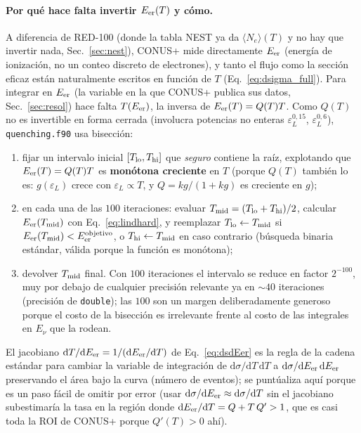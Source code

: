 \documentclass[11pt,a4paper]{article}
\newcommand{\eps}{\varepsilon}
\newcommand{\Enu}{E_{\nu}}
\newcommand{\Tnr}{T}
\newcommand{\Ne}{N_{e}}
\newcommand{\Eer}{E_{\rm er}}
\newcommand{\code}[1]{\texttt{#1}}
\newcommand{\dd}{\mathrm{d}}
\begin{document}
\paragraph{Por qu\'e hace falta invertir $\Eer(\Tnr)$ y c\'omo.} A diferencia de
RED-100 (donde la tabla NEST ya da $\langle\Ne\rangle(\Tnr)$ y no hay que
invertir nada, Sec.~\ref{sec:nest}), CONUS+ mide directamente $\Eer$ (energ\'ia
de ionizaci\'on, no un conteo discreto de electrones), y tanto el flujo como la
secci\'on eficaz est\'an naturalmente escritos en funci\'on de $\Tnr$
(Eq.~\eqref{eq:dsigma_full}). Para integrar en $\Eer$ (la variable en la que
CONUS+ publica sus datos, Sec.~\ref{sec:resol}) hace falta $\Tnr(\Eer)$, la
inversa de $\Eer(\Tnr)=Q(\Tnr)\Tnr$. Como $Q(\Tnr)$ no es invertible en forma
cerrada (involucra potencias no enteras $\eps_{L}^{0{,}15}$, $\eps_{L}^{0{,}6}$),
\code{quenching.f90} usa bisecci\'on:
\begin{enumerate}\itemsep2pt
  \item fijar un intervalo inicial $[\Tnr_{\rm lo},\Tnr_{\rm hi}]$ que
    \emph{seguro} contiene la ra\'iz, explotando que $\Eer(\Tnr)=Q(\Tnr)\Tnr$ es
    \textbf{mon\'otona creciente} en $\Tnr$ (porque $Q(\Tnr)$ tambi\'en lo es:
    $g(\eps_L)$ crece con $\eps_L\propto\Tnr$, y $Q=kg/(1+kg)$ es creciente en
    $g$);
  \item en cada una de las $100$ iteraciones: evaluar $\Tnr_{\rm mid}=
    (\Tnr_{\rm lo}+\Tnr_{\rm hi})/2$, calcular $\Eer(\Tnr_{\rm mid})$ con
    Eq.~\eqref{eq:lindhard}, y reemplazar $\Tnr_{\rm lo}\leftarrow\Tnr_{\rm mid}$
    si $\Eer(\Tnr_{\rm mid})<\Eer^{\rm objetivo}$, o $\Tnr_{\rm
    hi}\leftarrow\Tnr_{\rm mid}$ en caso contrario (b\'usqueda binaria est\'andar,
    v\'alida porque la funci\'on es mon\'otona);
  \item devolver $\Tnr_{\rm mid}$ final. Con $100$ iteraciones el intervalo se
    reduce en factor $2^{-100}$, muy por debajo de cualquier precisi\'on
    relevante ya en $\sim40$ iteraciones (precisi\'on de \code{double}); las $100$
    son un margen deliberadamente generoso porque el costo de la bisecci\'on es
    irrelevante frente al costo de las integrales en $\Enu$ que la rodean.
\end{enumerate}
El jacobiano $\dd\Tnr/\dd\Eer=1/(\dd\Eer/\dd\Tnr)$ de Eq.~\eqref{eq:dsdEer} es la
regla de la cadena est\'andar para cambiar la variable de integraci\'on de
$\dd\sigma/\dd\Tnr\,\dd\Tnr$ a $\dd\sigma/\dd\Eer\,\dd\Eer$ preservando el \'area
bajo la curva (n\'umero de eventos); se punt\'ualiza aqu\'i porque es un paso f\'acil
de omitir por error (usar $\dd\sigma/\dd\Eer\approx\dd\sigma/\dd\Tnr$ sin el
jacobiano subestimar\'ia la tasa en la regi\'on donde $\dd\Eer/\dd\Tnr=Q+\Tnr\,
Q'>1$, que es casi toda la ROI de CONUS+ porque $Q'(\Tnr)>0$ ah\'i).
\end{document}
